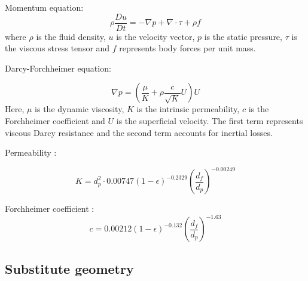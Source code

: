 \documentclass[a4paper]{article}
\begin{document}
Momentum equation:
\begin{equation}
  \rho \frac{Du}{Dt} = -\nabla p + \nabla \cdot \tau + \rho f
\end{equation}
where $\rho$ is the fluid density, $u$ is the velocity vector, $p$ is the static pressure, $\tau$ is the viscous stress tensor and $f$ represents body forces per unit mass.


Darcy-Forchheimer equation:

\begin{equation}
    \nabla p = \left( \dfrac{\mu}{K}  + \rho \dfrac{c}{\sqrt{K}} U   \right)U
\label{eq:DF}
\end{equation}
Here, $\mu$ is the dynamic viscosity, $K$ is the intrinsic permeability, $c$ is the Forchheimer coefficient and $U$ is the superficial velocity. The first term represents viscous Darcy resistance and the second term accounts for inertial losses.

Permeability \cite{Yang2021}\cite{Calmidi}:

\begin{equation}
    K = d_p^2 \cdot 0.00747(1-\epsilon)^{-0.2329} \left(\dfrac{d_f}{d_p}\right)^{-0.00249}
    \label{eq:DF2}
\end{equation}

Forchheimer coefficient \cite{Yang2021}\cite{Calmidi}:
\begin{equation}
    c = 0.00212(1-\epsilon)^{-0.132} \left(\dfrac{d_f}{d_p}\right)^{-1.63}
    \label{eq:DF3}
\end{equation}


\subsection{Substitute geometry}
\end{document}
